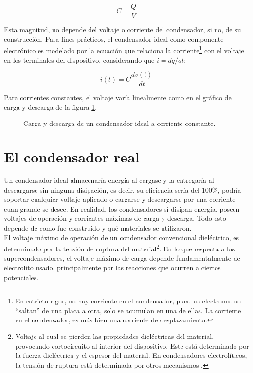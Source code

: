 \begin{equation}
	C = \frac{Q}{V}
\end{equation}

Esta magnitud, no depende del voltaje o corriente del condensador, si no, de su construcción. Para fines prácticos, el condensador ideal como componente electrónico es modelado por la ecuación que relaciona la corriente\footnote{En estricto rigor, no hay corriente en el condensador, pues los electrones no ``saltan'' de una placa a otra, solo se acumulan en una de ellas. La corriente en el condensador, es más bien una corriente de desplazamiento.} con el voltaje en los terminales del dispositivo, considerando que $i = dq/dt$:

\begin{equation}
	i(t) = C \frac{dv(t)}{dt}
\end{equation}

Para corrientes constantes, el voltaje varía linealmente como en el gráfico de carga y descarga de la figura \ref{fig:plot:charge-discharge_ideal_cap}.
\begin{figure}[h!]
	\centering
	\caption{Carga y descarga de un condensador ideal a corriente constante.}
	\label{fig:plot:charge-discharge_ideal_cap}
\end{figure}

\section{El condensador real}
Un condensador ideal almacenaría energía al cargase y la entregaría al descargarse sin ninguna disipación, es decir, su eficiencia sería del 100\%, podría soportar cualquier voltaje aplicado o cargarse y descargarse por una corriente cuan grande se desee.  En realidad, los condensadores sí disipan energía, poseen voltajes de operación y corrientes máximas de carga y descarga. Todo esto depende de como fue construido y qué materiales se utilizaron.\\
El voltaje máximo de operación de un condensador convencional dieléctrico, es determinado por la tensión de ruptura del material\footnote{Voltaje al cual se pierden las propiedades dieléctricas del material, provocando cortocircuito al interior del dispositivo. Este está determinado por la fuerza dieléctrica y el espesor del material. En condensadores electrolíticos, la tensión de ruptura está determinada por otros mecanismos \citep{Yahalom1971}.}. En lo que respecta a los supercondensadores, el voltaje máximo de carga depende fundamentalmente de electrolíto usado, principalmente por las reacciones que ocurren a ciertos potenciales.\\

